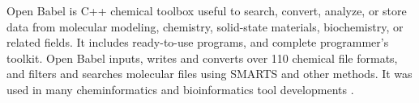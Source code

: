 Open Babel is C++ chemical toolbox useful to search, convert, analyze, or store data from molecular modeling, chemistry, solid-state materials, biochemistry, or related fields. It includes ready-to-use programs, and complete programmer's toolkit. Open Babel inputs, writes and converts over 110 chemical file formats, and filters and searches molecular files using SMARTS and other methods. It was used in many cheminformatics and bioinformatics tool developments \cite{O_Boyle_2011}.